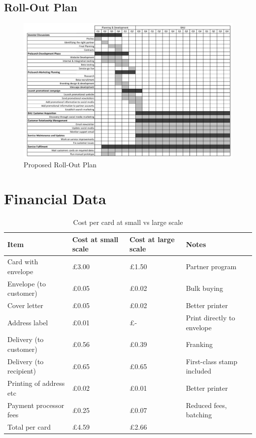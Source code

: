 \documentclass[10pt,a4paper]{article}
\begin{document}
\begin{appendices}
\clearpage

\begin{landscape}
\section{Roll-Out Plan}
\label{app:rollout}
  \begin{figure}[!htb]
\includegraphics[width=1.0\linewidth]{rollout.png}
    \caption{Proposed Roll-Out Plan}
  \end{figure}
\clearpage
\end{landscape}


\section{Financial Data}
\begin{table}[]
	\centering
	\caption{Cost per card at small vs large scale}
	\label{table:costpercard}
	\begin{tabular}{llll}
		Item                    & Cost at small scale & Cost at large scale & Notes                      \\ \hline
		Card with envelope      & £3.00               & £1.50               & Partner program       	 \\
		Envelope (to customer)  & £0.05               & £0.02               & Bulk buying                \\
		Cover letter            & £0.05               & £0.02               & Better printer             \\
		Address label           & £0.01               & £-                  & Print directly to envelope \\
		Delivery (to customer)  & £0.56               & £0.39               & Franking                   \\
		Delivery (to recipient) & £0.65               & £0.65               & First-class stamp included \\
		Printing of address etc & £0.02               & £0.01               & Better printer             \\
		Payment processor fees  & £0.25               & £0.07               & Reduced fees, batching     \\ \hline
		Total per card          & £4.59               & £2.66               &
	\end{tabular}
\end{table}


\end{appendices}
\end{document}

